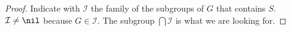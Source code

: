 \begin{proof}
Indicate with \(\mathcal I\) the family of the subgroups of \(G\) that contains \(S\). \(\mathcal I \ne \nil\) because \(G \in \mathcal I\). The subgroup \(\bigcap \mathcal I\) is what we are looking for.
\end{proof}



